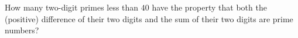 How many two-digit primes less than $40$ have the property that both the (positive) difference of their two digits and the sum of their two digits are prime numbers?
